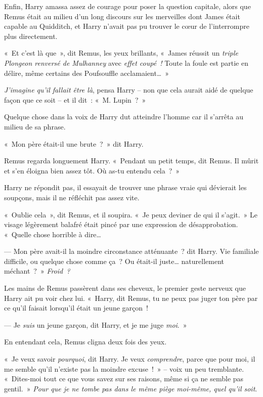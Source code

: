 Enfin, Harry amassa assez de courage pour poser la question capitale, alors que Remus était au milieu d'un long discours sur les merveilles dont James était capable au Quidditch, et Harry n'avait pas pu trouver le cœur de l'interrompre plus directement.

«~Et c'est là que~», dit Remus, les yeux brillants, «~James réussit un \emph{triple Plongeon renversé de Mulhanney} avec \emph{effet coupé~!} Toute la foule est partie en délire, même certains des Poufsouffle acclamaient…~»

\emph{J'imagine qu'il fallait être là}, pensa Harry -- non que cela aurait aidé de quelque façon que ce soit -- et il dit~: «~M. Lupin~?~»

Quelque chose dans la voix de Harry dut atteindre l'homme car il s'arrêta au milieu de sa phrase.

«~Mon père était-il une brute~?~»
dit Harry.

Remus regarda longuement Harry.
«~Pendant un petit temps, dit Remus.
Il mûrit et s'en éloigna bien assez tôt.
Où as-tu entendu cela~?~»

Harry ne répondit pas, il essayait de trouver une phrase vraie qui dévierait les soupçons, mais il ne réfléchit pas assez vite.

«~Oublie cela~», dit Remus, et il soupira.
«~Je peux deviner de qui il s'agit.~»
Le visage légèrement balafré était pincé par une expression de désapprobation.
«~Quelle chose horrible à dire…

--- Mon père avait-il la moindre circonstance atténuante~? dit Harry.
Vie familiale difficile, ou quelque chose comme ça~?
Ou était-il juste… naturellement méchant~?~»
\emph{Froid~?}

Les mains de Remus passèrent dans ses cheveux, le premier geste nerveux que Harry ait pu voir chez lui.
«~Harry, dit Remus, tu ne peux pas juger ton père par ce qu'il faisait lorsqu'il était un jeune garçon~!

--- Je \emph{suis} un jeune garçon, dit Harry, et je me juge \emph{moi}.~»

En entendant cela, Remus cligna deux fois des yeux.

«~Je veux savoir \emph{pourquoi}, dit Harry.
Je veux \emph{comprendre}, parce que pour moi, il me semble qu'il n'existe pas la moindre excuse~!~»
-- voix un peu tremblante.
«~Dites-moi tout ce que vous savez sur ses raisons, même si ça ne semble pas gentil.~»
\emph{Pour que je ne tombe pas dans le même piège moi-même, quel qu'il soit}.


